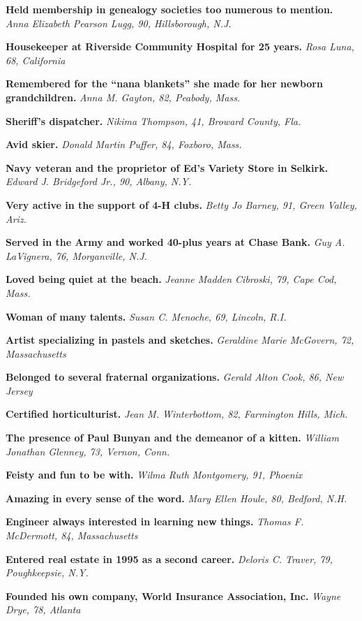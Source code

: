 \textbf{Held membership in genealogy societies too numerous to mention.}
\emph{Anna Elizabeth Pearson Lugg, 90, Hillsborough, N.J.}

\textbf{Housekeeper at Riverside Community Hospital for 25 years.}
\emph{Rosa Luna, 68, California}

\textbf{Remembered for the ``nana blankets'' she made for her newborn
grandchildren.} \emph{Anna M. Gayton, 82, Peabody, Mass.}

\textbf{Sheriff's dispatcher.} \emph{Nikima Thompson, 41, Broward
County, Fla.}

\textbf{Avid skier.} \emph{Donald Martin Puffer, 84, Foxboro, Mass.}

\textbf{Navy veteran and the proprietor of Ed's Variety Store in
Selkirk.} \emph{Edward J. Bridgeford Jr., 90, Albany, N.Y.}

\textbf{Very active in the support of 4-H clubs.} \emph{Betty Jo Barney,
91, Green Valley, Ariz.}

\textbf{Served in the Army and worked 40-plus years at Chase Bank.}
\emph{Guy A. LaVignera, 76, Morganville, N.J.}

\textbf{Loved being quiet at the beach.} \emph{Jeanne Madden Cibroski,
79, Cape Cod, Mass.}

\textbf{Woman of many talents.} \emph{Susan C. Menoche, 69, Lincoln,
R.I.}

\textbf{Artist specializing in pastels and sketches.} \emph{Geraldine
Marie McGovern, 72, Massachusetts}

\textbf{Belonged to several fraternal organizations.} \emph{Gerald Alton
Cook, 86, New Jersey}

\textbf{Certified horticulturist.} \emph{Jean M. Winterbottom, 82,
Farmington Hills, Mich.}

\textbf{The presence of Paul Bunyan and the demeanor of a kitten.}
\emph{William Jonathan Glenney, 73, Vernon, Conn.}

\textbf{Feisty and fun to be with.} \emph{Wilma Ruth Montgomery, 91,
Phoenix}

\textbf{Amazing in every sense of the word.} \emph{Mary Ellen Houle, 80,
Bedford, N.H.}

\textbf{Engineer always interested in learning new things.} \emph{Thomas
F. McDermott, 84, Massachusetts}

\textbf{Entered real estate in 1995 as a second career.} \emph{Deloris
C. Traver, 79, Poughkeepsie, N.Y.}

\textbf{Founded his own company, World Insurance Association, Inc.}
\emph{Wayne Drye, 78, Atlanta}

